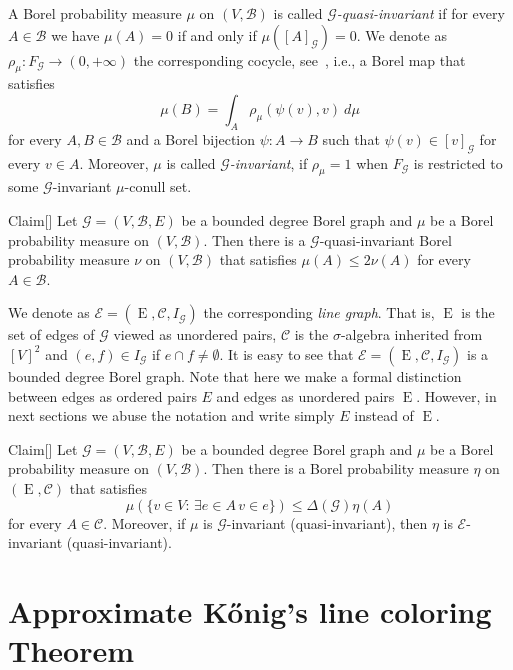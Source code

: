 \documentclass[AHL,Unicode,longabstracts,published]{cedram}
\newcommand{\fE}{\operatorname{E}}
\newcommand{\clG}{\mathcal{G}}
\newcommand{\clB}{\mathcal{B}}
\newcommand{\clE}{\mathcal{E}}
\newcommand{\clC}{\mathcal{C}}
\let\oldexists\exists
\renewcommand*{\exists}{\mathrel{\oldexists}}
\newcommand{\clG}{\mathcal{G}}
\begin{document}
A Borel probability measure $\mu$ on $(V,\clB)$ is called \emph{$\clG$-quasi-invariant} if for every $A\in \clB$ we have $\mu(A)=0$ if and only if $\mu([A]_\clG)=0$. We denote as $\rho_\mu:F_\clG\to (0,+\infty)$ the corresponding cocycle, see~\cite[Proposition~8.3]{KechrisMiller}, i.e., a Borel map that satisfies
\[
\mu(B)=\int_A \rho_\mu(\psi(v),v) \ d\mu
\]
for every $A,B\in \clB$ and a Borel bijection $\psi:A\to B$ such that $\psi(v)\in [v]_\clG$ for every $v\in A$. Moreover, $\mu$ is called \emph{$\clG$-invariant}, if $\rho_\mu=1$ when $F_\clG$ is restricted to some $\clG$-invariant $\mu$-conull set.


\begin{enonce}{Claim}[{\cite[Proposition~3.2]{Vizing}\label{cl:quasi invariant}}]
Let $\clG=(V,\clB,E)$ be a bounded degree Borel graph and $\mu$ be a Borel probability measure on $(V,\clB)$. Then there is a $\clG$-quasi-invariant Borel probability measure $\nu$ on $(V,\clB)$ that satisfies $\mu(A)\le 2\nu(A)$ for every $A\in \clB$.
\end{enonce}


We denote as $\clE=(\fE,\clC,I_\clG)$ the corresponding \emph{line graph}. That is, $\fE$ is the set of edges of $\clG$ viewed as unordered pairs, $\clC$ is the $\sigma$-algebra inherited from $[V]^2$ and $(e,f)\in I_{\clG}$ if $e\cap f\not =\emptyset$. It is easy to see that $\clE=(\fE,\clC,I_\clG)$ is a bounded degree Borel graph. Note that here we make a formal distinction between edges as ordered pairs $E$ and edges as unordered pairs $\fE$. However, in next sections we abuse the notation and write simply $E$ instead of $\fE$.

\begin{enonce}{Claim}[{\cite[Proposition~3.1]{Vizing}\label{cl:measure on edges}}]
Let $\clG=(V,\clB,E)$ be a bounded degree Borel graph and $\mu$ be a Borel probability measure on $(V,\clB)$. Then there is a Borel probability measure $\eta$ on $(\fE,\clC)$ that satisfies
\[
\mu\left(\{v\in V :\,\exists e\in A \, v\in e\}\right)\le \Delta(\clG)\eta(A)
\]
for every $A\in \clC$. Moreover, if $\mu$ is $\clG$-invariant (quasi-invariant), then $\eta$ is $\clE$-invariant (quasi-invariant).
\end{enonce}



\section{Approximate Kőnig's line coloring Theorem}
\end{document}
